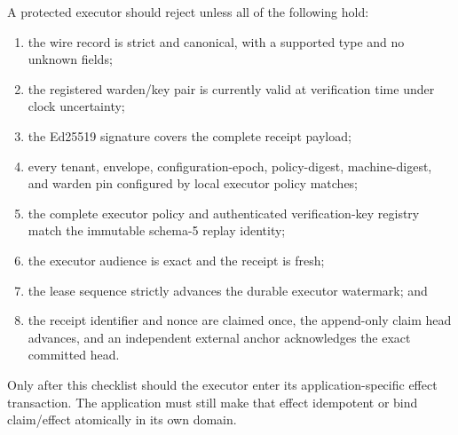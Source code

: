 \documentclass[10pt]{article}
\begin{document}
A protected executor should reject unless all of the following hold:
\begin{enumerate}
  \item the wire record is strict and canonical, with a supported type and no unknown fields;
  \item the registered warden/key pair is currently valid at verification time under clock uncertainty;
  \item the Ed25519 signature covers the complete receipt payload;
  \item every tenant, envelope, configuration-epoch, policy-digest, machine-digest, and warden pin
  configured by local executor policy matches;
  \item the complete executor policy and authenticated verification-key registry match the
  immutable schema-5 replay identity;
  \item the executor audience is exact and the receipt is fresh;
  \item the lease sequence strictly advances the durable executor watermark; and
  \item the receipt identifier and nonce are claimed once, the append-only claim head advances,
  and an independent external anchor acknowledges the exact committed head.
\end{enumerate}
Only after this checklist should the executor enter its application-specific effect transaction.
The application must still make that effect idempotent or bind claim/effect atomically in its own
domain.


\renewcommand{\bibfont}{\footnotesize}

\end{document}
